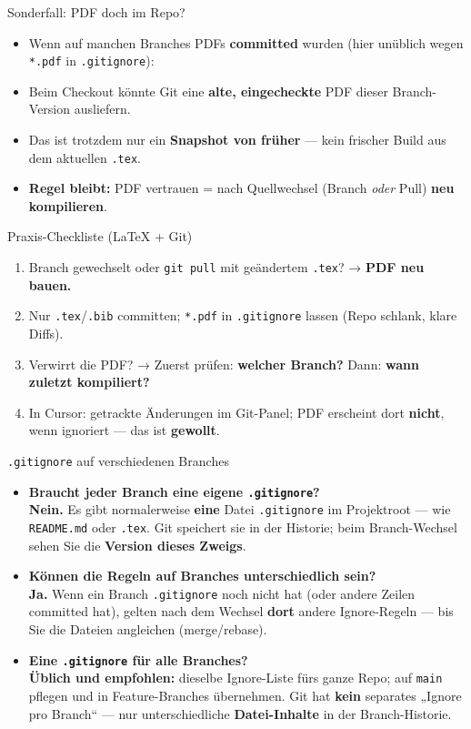 \documentclass{beamer}
\begin{document}
\begin{frame}{Sonderfall: PDF doch im Repo?}
\begin{itemize}
\item Wenn auf manchen Branches PDFs \textbf{committed} wurden (hier unüblich wegen \texttt{*.pdf} in \texttt{.gitignore}):
\item Beim Checkout könnte Git eine \textbf{alte, eingecheckte} PDF dieser Branch-Version ausliefern.
\item Das ist trotzdem nur ein \textbf{Snapshot von früher} — kein frischer Build aus dem aktuellen \texttt{.tex}.
\item \textbf{Regel bleibt:} PDF vertrauen = nach Quellwechsel (Branch \emph{oder} Pull) \textbf{neu kompilieren}.
\end{itemize}
\end{frame}

\begin{frame}[fragile]{Praxis-Checkliste (LaTeX + Git)}
\begin{enumerate}
\item Branch gewechselt oder \texttt{git pull} mit geändertem \texttt{.tex}? → \textbf{PDF neu bauen.}
\item Nur \texttt{.tex}/\texttt{.bib} committen; \texttt{*.pdf} in \texttt{.gitignore} lassen (Repo schlank, klare Diffs).
\item Verwirrt die PDF? → Zuerst prüfen: \textbf{welcher Branch?} Dann: \textbf{wann zuletzt kompiliert?}
\item In Cursor: getrackte Änderungen im Git-Panel; PDF erscheint dort \textbf{nicht}, wenn ignoriert — das ist \textbf{gewollt}.
\end{enumerate}
\end{frame}

\begin{frame}{\texttt{.gitignore} auf verschiedenen Branches}
\begin{itemize}
\item \textbf{Braucht jeder Branch eine eigene \texttt{.gitignore}?}\\
\textbf{Nein.} Es gibt normalerweise \textbf{eine} Datei \texttt{.gitignore} im Projektroot — wie \texttt{README.md} oder \texttt{.tex}. Git speichert sie in der Historie; beim Branch-Wechsel sehen Sie die \textbf{Version dieses Zweigs}.
\item \textbf{Können die Regeln auf Branches unterschiedlich sein?}\\
\textbf{Ja.} Wenn ein Branch \texttt{.gitignore} noch nicht hat (oder andere Zeilen committed hat), gelten nach dem Wechsel \textbf{dort} andere Ignore-Regeln — bis Sie die Dateien angleichen (merge/rebase).
\item \textbf{Eine \texttt{.gitignore} für alle Branches?}\\
\textbf{Üblich und empfohlen:} dieselbe Ignore-Liste fürs ganze Repo; auf \texttt{main} pflegen und in Feature-Branches übernehmen. Git hat \textbf{kein} separates „Ignore pro Branch“ — nur unterschiedliche \textbf{Datei-Inhalte} in der Branch-Historie.
\end{itemize}
\end{frame}
\end{document}
